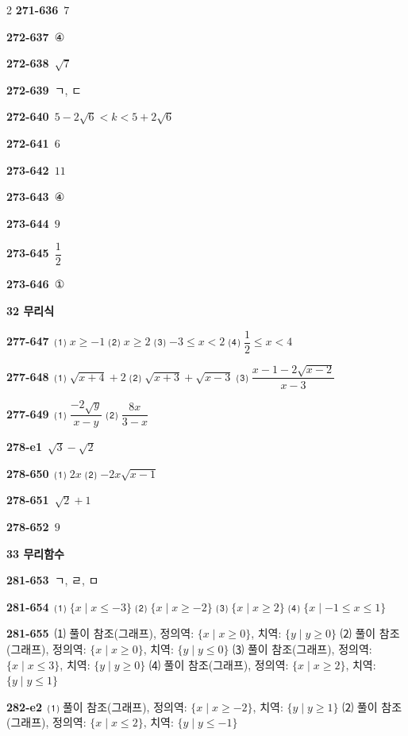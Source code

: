 \documentclass[10pt,a4paper]{article}
\begin{document}
\begin{multicols}{2}
\noindent\textbf{271-636}\ $7$\par
\noindent\textbf{272-637}\ ④\par
\noindent\textbf{272-638}\ $\sqrt{7}$\par
\noindent\textbf{272-639}\ ㄱ, ㄷ\par
\noindent\textbf{272-640}\ $5-2\sqrt{6}<k<5+2\sqrt{6}$\par
\noindent\textbf{272-641}\ $6$\par
\noindent\textbf{273-642}\ $11$\par
\noindent\textbf{273-643}\ ④\par
\noindent\textbf{273-644}\ $9$\par
\noindent\textbf{273-645}\ $\dfrac{1}{2}$\par
\noindent\textbf{273-646}\ ①\par
\noindent\textbf{32 무리식}\par\smallskip
\noindent\textbf{277-647}\ ⑴ $x\ge -1$ ⑵ $x\ge 2$ ⑶ $-3\le x<2$ ⑷ $\dfrac{1}{2}\le x<4$\par
\noindent\textbf{277-648}\ ⑴ $\sqrt{x+4}+2$ ⑵ $\sqrt{x+3}+\sqrt{x-3}$ ⑶ $\dfrac{x-1-2\sqrt{x-2}}{x-3}$\par
\noindent\textbf{277-649}\ ⑴ $\dfrac{-2\sqrt{y}}{x-y}$ ⑵ $\dfrac{8x}{3-x}$\par
\noindent\textbf{278-e1}\ $\sqrt{3}-\sqrt{2}$\par
\noindent\textbf{278-650}\ ⑴ $2x$ ⑵ $-2x\sqrt{x-1}$\par
\noindent\textbf{278-651}\ $\sqrt{2}+1$\par
\noindent\textbf{278-652}\ $9$\par
\noindent\textbf{33 무리함수}\par\smallskip
\noindent\textbf{281-653}\ ㄱ, ㄹ, ㅁ\par
\noindent\textbf{281-654}\ ⑴ $\{x \mid x\le -3\}$ ⑵ $\{x \mid x\ge -2\}$ ⑶ $\{x \mid x\ge 2\}$ ⑷ $\{x \mid -1\le x\le 1\}$\par
\noindent\textbf{281-655}\ ⑴ 풀이 참조(그래프), 정의역: $\{x \mid x\ge 0\}$, 치역: $\{y \mid y\ge 0\}$ ⑵ 풀이 참조(그래프), 정의역: $\{x \mid x\ge 0\}$, 치역: $\{y \mid y\le 0\}$ ⑶ 풀이 참조(그래프), 정의역: $\{x \mid x\le 3\}$, 치역: $\{y \mid y\ge 0\}$ ⑷ 풀이 참조(그래프), 정의역: $\{x \mid x\ge 2\}$, 치역: $\{y \mid y\le 1\}$\par
\noindent\textbf{282-e2}\ ⑴ 풀이 참조(그래프), 정의역: $\{x \mid x\ge -2\}$, 치역: $\{y \mid y\ge 1\}$ ⑵ 풀이 참조(그래프), 정의역: $\{x \mid x\le 2\}$, 치역: $\{y \mid y\le -1\}$\par

\end{multicols}
\end{document}
